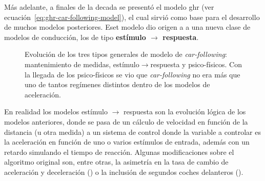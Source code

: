 
Más adelante, a finales de la decada se presentó el modelo \gls{ghr} (ver ecuación~\ref{eq:ghr-car-following-model}), el cual sirvió como base para el desarrollo de muchos modelos posteriores. Eset modelo dio origen a a una nueva clase de modelos de conducción, los de tipo \textbf{estímulo $\rightarrow$ respuesta}. 

\begin{figure}
	\begin{center}
		\caption{Evolución de los tres tipos generales de modelo de \textit{car-following}: mantenimiento de medidas, estímulo$\rightarrow$respuesta y psico-físicos. Con la llegada de los psico-físicos se vio que \textit{car-following} no era más que uno de tantos regímenes distintos dentro de los modelos de aceleración.}
		\label{fig:car-following-there-different-models}
	\end{center}
\end{figure}

En realidad los modelos estímulo $\rightarrow$ respuesta son la evolución lógica de los modelos anteriores, donde se pasa de un cálculo de velocidad en función de la distancia (u otra medida) a un sistema de control donde la variable a controlar es la aceleración en función de uno o varios estímulos de entrada, además con un retardo simulando el tiempo de reacción. Algunas modificaciones sobre el algoritmo original son, entre otras, la asimetría en la tasa de cambio de aceleración y deceleración (\cite{Gazis1959}) o la inclusión de segundos coches delanteros (\cite{Bexelius1968}).

